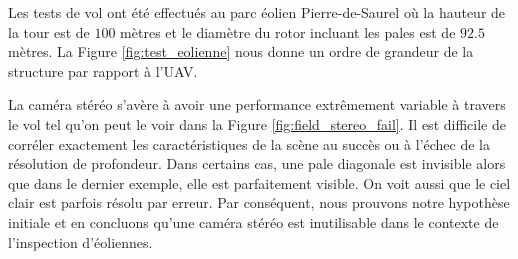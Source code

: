 Les tests de vol ont été effectués au parc éolien Pierre-de-Saurel où la hauteur de la tour est de $100$ mètres et le diamètre du rotor incluant les pales est de $92.5$ mètres. La Figure \ref{fig:test_eolienne} nous donne un ordre de grandeur de la structure par rapport à l'UAV.

%

La caméra stéréo s'avère à avoir une performance extrêmement variable à travers le vol tel qu'on peut le voir dans la Figure \ref{fig:field_stereo_fail}. Il est difficile de corréler exactement les caractéristiques de la scène au succès ou à l'échec de la résolution de profondeur. Dans certains cas, une pale diagonale est invisible alors que dans le dernier exemple, elle est parfaitement visible. On voit aussi que le ciel clair est parfois résolu par erreur. Par conséquent, nous prouvons notre hypothèse initiale et en concluons qu'une caméra stéréo est inutilisable dans le contexte de l'inspection d'éoliennes.

